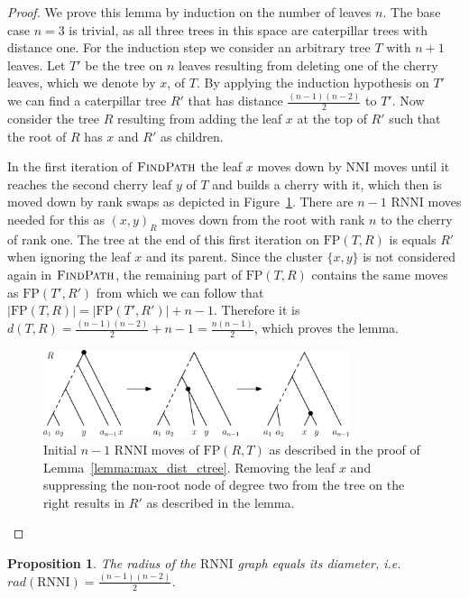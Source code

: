\documentclass[11pt]{amsart}
\newtheorem{proposition}{Proposition}
\newcommand{\rnni}{\mathrm{RNNI}}
\newcommand{\findpath}{\textsc{FindPath}}
\newcommand{\nni}{\mathrm{NNI}}
\newcommand{\fp}{\mathrm{FP}}
\newcommand{\rad}{\mathit{rad}}
\begin{document}
\begin{proof}
	We prove this lemma by induction on the number of leaves $n$.
	The base case $n=3$ is trivial, as all three trees in this space are caterpillar trees with distance one.
	For the induction step we consider an arbitrary tree $T$ with $n + 1$ leaves.
	Let $T'$ be the tree on $n$ leaves resulting from deleting one of the cherry leaves, which we denote by $x$, of $T$.
	By applying the induction hypothesis on $T'$ we can find a caterpillar tree $R'$ that has distance $\frac{(n-1)(n-2)}{2}$ to $T'$.
	Now consider the tree $R$ resulting from adding the leaf $x$ at the top of $R'$ such that the root of $R$ has $x$ and $R'$ as children.

	In the first iteration of $\findpath$ the leaf $x$ moves down by $\nni$ moves until it reaches the second cherry leaf $y$ of $T$ and builds a cherry with it, which then is moved down by rank swaps as depicted in Figure~\ref{fig:max_dist_ctree}.
	There are $n-1$ $\rnni$ moves needed for this as $(x,y)_R$ moves down from the root with rank $n$ to the cherry of rank one.
	The tree at the end of this first iteration on $\fp(T,R)$ is equals $R'$ when ignoring the leaf $x$ and its parent.
	Since the cluster $\{x,y\}$ is not considered again in $\findpath$, the remaining part of $\fp(T,R)$ contains the same moves as $\fp(T',R')$ from which we can follow that $|\fp(T,R)| = |\fp(T',R')| + n-1$.
	Therefore it is $d(T,R) = \frac{(n-1)(n-2)}{2} + n-1 = \frac{n(n-1)}{2}$, which proves the lemma.
	\begin{figure}[ht]
		\includegraphics[width=0.8\textwidth]{max_dist_ctree.eps}
		\caption{Initial $n - 1$ $\rnni$ moves of $\fp(R,T)$ as described in the proof of Lemma~\ref{lemma:max_dist_ctree}.
		Removing the leaf $x$ and suppressing the non-root node of degree two from the tree on the right results in $R'$ as described in the lemma.}
		\label{fig:max_dist_ctree}
	\end{figure}
\end{proof}

\begin{proposition}
	The radius of the $\rnni$ graph equals its diameter, i.e. $\rad(\rnni) = \frac{(n-1)(n-2)}{2}$.
\end{proposition}
\end{document}
